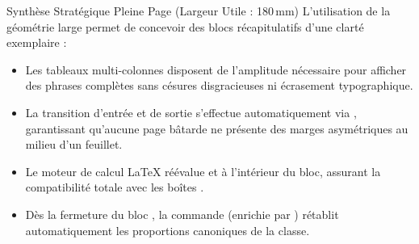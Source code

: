 \begin{WideGeometry}
\begin{boiteSynthese}{Synthèse Stratégique Pleine Page (Largeur Utile : 180\,mm)}
L'utilisation de la géométrie large permet de concevoir des blocs récapitulatifs d'une clarté exemplaire :
\begin{itemize}
  \item Les tableaux multi-colonnes disposent de l'amplitude nécessaire pour afficher des phrases complètes
  sans césures disgracieuses ni écrasement typographique.
  \item La transition d'entrée et de sortie s'effectue automatiquement via ,
  garantissant qu'aucune page bâtarde ne présente des marges asymétriques au milieu d'un feuillet.
  \item Le moteur de calcul \LaTeX{} réévalue  et 
  à l'intérieur du bloc, assurant la compatibilité totale avec les boîtes .
  \item Dès la fermeture du bloc , la commande  (enrichie par ) rétablit automatiquement les proportions canoniques de la classe.
\end{itemize}
\end{boiteSynthese}

\end{WideGeometry}
\activerStyleStandard

